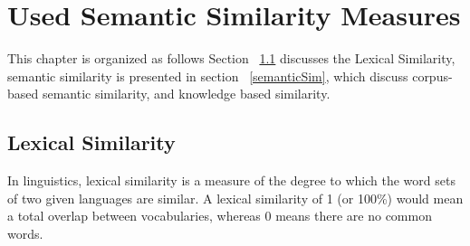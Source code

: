 
\chapter{Used Semantic Similarity Measures} %

\label{sim} %



This chapter is organized as follows Section ~\ref{lexicalsim} discusses the Lexical Similarity, semantic similarity is presented in section ~\ref{semanticSim}, which discuss corpus-based semantic similarity, and knowledge based similarity.

\section{Lexical Similarity}
\label {lexicalsim}
In linguistics, lexical similarity is a measure of the degree to which the word sets of two given languages  are similar. A lexical similarity of 1 (or 100\%) would mean a total overlap between vocabularies, whereas 0 means there are no common words.\\


